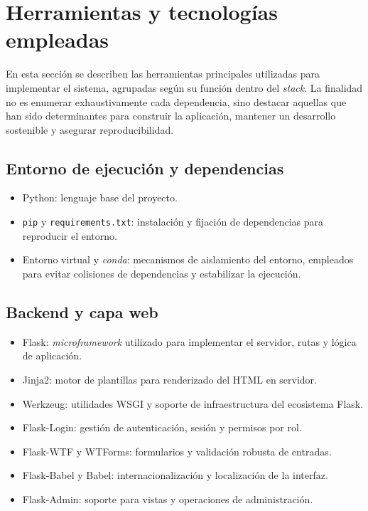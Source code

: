 \section{Herramientas y tecnologías empleadas}

En esta sección se describen las herramientas principales utilizadas para implementar el sistema, agrupadas según su función dentro del \textit{stack}. La finalidad no es enumerar exhaustivamente cada dependencia, sino destacar aquellas que han sido determinantes para construir la aplicación, mantener un desarrollo sostenible y asegurar reproducibilidad.

\subsection{Entorno de ejecución y dependencias}

\begin{itemize}
	\item Python: lenguaje base del proyecto.
	\item \texttt{pip} y \texttt{requirements.txt}: instalación y fijación de dependencias para reproducir el entorno.
	\item Entorno virtual y \textit{conda}: mecanismos de aislamiento del entorno, empleados para evitar colisiones de dependencias y estabilizar la ejecución.
\end{itemize}

\subsection{Backend y capa web}

\begin{itemize}
	\item Flask: \textit{microframework} utilizado para implementar el servidor, rutas y lógica de aplicación.
	\item Jinja2: motor de plantillas para renderizado del HTML en servidor.
	\item Werkzeug: utilidades WSGI y soporte de infraestructura del ecosistema Flask.
	\item Flask-Login: gestión de autenticación, sesión y permisos por rol.
	\item Flask-WTF y WTForms: formularios y validación robusta de entradas.
	\item Flask-Babel y Babel: internacionalización y localización de la interfaz.
	\item Flask-Admin: soporte para vistas y operaciones de administración.
\end{itemize}

